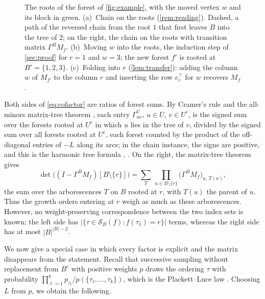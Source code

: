 \documentclass[onefignum,onetabnum,nohypdvips]{siamart250211}
\numberwithin{theorem}{section}
\numberwithin{equation}{section}
\newcommand{\Orders}{\mathcal{S}}
\begin{document}
\begin{figure}[t]
{}
\caption{The roots of the forest of \cref{fig:example}, with the
moved vertex $w$ and its block in green. (a)~Chain on the roots
(\cref{rem:reading}). Dashed, a path of the reversed chain from the root
$1$ that first leaves $B$ into the tree of $2$; on the right, the chain
on the roots with transition matrix $\Gamma^BM_f$. (b)~Moving $w$ into
the roots, the induction step of \cref{sec:proof} for $r=1$ and $w=3$;
the new forest $f'$ is rooted at $B'=\{1,2,3\}$. (c)~Folding into $r$
(\cref{lem:transfer}): adding the column $w$ of $M_{f'}$ to the column
$r$ and inserting the row $e_r^{\top}$ for $w$ recovers $M_f$.}
\label{fig:transfer}
\end{figure}
\begin{remark}\label{rem:forest}
Both sides of \eqref{eq:cofactor} are ratios of forest sums. By
Cramer's rule and the all-minors matrix-tree theorem \cite{Chaiken1982},
each entry $\Gamma^U_{uv}$, $u\in U$, $v\in U^c$, is the signed sum over
the forests rooted at $U^c$ in which $u$ lies in the tree of $v$,
divided by the signed sum over all forests rooted at $U^c$, each forest
counted by the product of the off-diagonal entries of $-L$ along its
arcs; in the chain instance, the signs are positive, and this is the
harmonic tree formula \cite[(1.9)]{PitmanTang2018}, \cite{Pokarowski1999}.
On the right, the matrix-tree theorem \cite{Tutte1948,Chaiken1982} gives
\begin{equation}\label{eq:arborescence}
\det\big((I-\Gamma^BM_f)[B\setminus\{r\}]\big)
=\sum_{T}\ \prod_{u\in B\setminus\{r\}}\big(\Gamma^BM_f\big)_{u,\,T(u)},
\end{equation}
the sum over the arborescences $T$ on $B$ rooted at $r$, with $T(u)$
the parent of $u$. Thus the growth orders entering
at $r$ weigh as much as these arborescences. However, no
weight-preserving correspondence between the two index sets is known;
the left side has $|\{\tau\in\Orders_B(f):f(\tau_1)=r\}|$ terms, whereas the right side has at
most $|B|^{|B|-2}$.
\end{remark}
We now give a special case in which every factor is explicit and the
matrix disappears from the statement. Recall that successive sampling
without replacement from $B^c$ with positive weights $p$ draws the
ordering $\tau$ with probability
$\prod_{\ell=1}^{k}p_{\tau_\ell}/p(\{\tau_\ell,\dots,\tau_k\})$, which is
the Plackett--Luce law \cite{Luce1959,Plackett1975}. Choosing $L$ from $p$, we
obtain the following.
\end{document}
